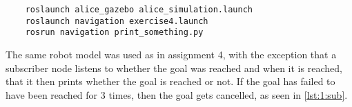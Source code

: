 
\begin{lstlisting}
	roslaunch alice_gazebo alice_simulation.launch	
	roslaunch navigation exercise4.launch
	rosrun navigation print_something.py
\end{lstlisting}

The same robot model was used as in assignment 4, with the exception that a subscriber node listens to whether the goal was reached and when it is reached, that it then prints whether the goal is reached or not. If the goal has failed to have been reached for 3 times, then the goal gets cancelled, as seen in \cref{lst:1:sub}.

